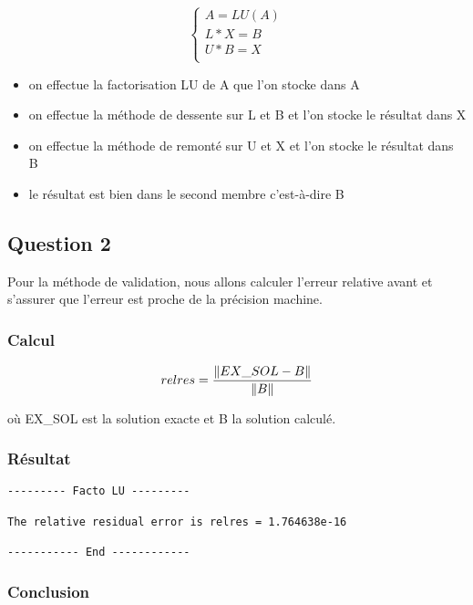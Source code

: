 \documentclass[11pt]{article}
\DeclarePairedDelimiter{\norm}{\lVert}{\rVert}
\begin{document}
\begin{equation*}
  \left\{
  \begin{array}{l}
    A = LU(A) \\
    L * X = B \\
    U * B = X \\
  \end{array}
  \right.
\end{equation*}

\begin{itemize}
\item on effectue la factorisation LU de A que l'on stocke dans A
\item on effectue la méthode de dessente sur L et B et l'on stocke le
  résultat dans X
\item on effectue la méthode de remonté sur U et X et l'on stocke le
  résultat dans B
\item le résultat est bien dans le second membre c'est-à-dire B
\end{itemize}

\subsection{Question 2}

Pour la méthode de validation, nous allons calculer l'erreur relative
avant et s'assurer que l'erreur est proche de la précision machine.

\subsubsection{Calcul}

\begin{equation*}
relres = \frac{\norm{EX\_SOL - B}}{\norm{B}}
\end{equation*}

où EX\_SOL est la solution exacte et B la solution calculé.

\subsubsection{Résultat}

\begin{lstlisting}
--------- Facto LU ---------

The relative residual error is relres = 1.764638e-16

----------- End ------------
\end{lstlisting}

\subsubsection{Conclusion}
\end{document}
